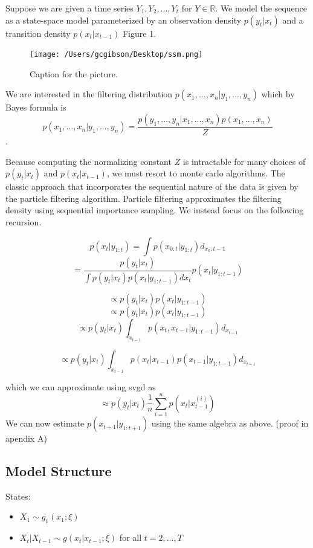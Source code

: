 \documentclass[]{article}
\begin{document}
Suppose we are given a time series \(Y_1,Y_2,...,Y_t\) for
\(Y \in \mathbb{R}\). We model the sequence as a state-space model
parameterized by an observation density \(p(y_t | x_t)\) and a
transition density \(p(x_t | x_{t-1})\) Figure 1.

\begin{figure}[htbp]
\centering
\texttt{[image: /Users/gcgibson/Desktop/ssm.png]}
\caption{Caption for the picture.}
\end{figure}

We are interested in the filtering distribution
\(p(x_1,...,x_n | y_1,...,y_n)\) which by Bayes formula is
\[p(x_1,...,x_n | y_1,...,y_n) = \frac{p(y_1,...,y_n | x_1,...,x_n) p(x_1,...,x_n)}{Z}\].

Because computing the normalizing constant \(Z\) is intractable for many
choices of \(p(y_t | x_t)\) and \(p(x_t | x_{t-1})\), we must resort to
monte carlo algorithms. The classic approach that incorporates the
sequential nature of the data is given by the particle filtering
algorithm. Particle filtering approximates the filtering density using
sequential importance sampling. We instead focus on the following
recursion.

\[p(x_t | y_{1:t}) = \int p(x_{0:t} | y_{1:t})d_{x_0:t-1}\]
\[=\frac{p(y_t | x_t)}{\int p(y_t|x_t)p(x_t | y_{1:t-1})dx_t}p(x_t | y_{1:t-1})\]

\[\propto p(y_t|x_t)p(x_t | y_{1:t-1})\]
\[\propto p(y_t|x_t)p(x_t | y_{1:t-1})\]
\[\propto p(y_t|x_t)\int_{x_{t-1}}p(x_t,x_{t-1} | y_{1:t-1})d_{x_{t-1}}\]

\[\propto p(y_t|x_t)\int_{x_{t-1}}p(x_t |x_{t-1} )p(x_{t-1}| y_{1:t-1})d_{x_{t-1}}\]

which we can approximate using svgd as
\[\approx p(y_t|x_t) \frac{1}{n}\sum_{i=1}^n p(x_t | x_{t-1}^{(i)})\] We
can now estimate \(p(x_{t+1}|y_{1:t+1})\) using the same algebra as
above. (proof in apendix A)

\subsection{Model Structure}\label{model-structure}

States:

\begin{itemize}
\item $X_1 \sim g_1(x_1 ; \xi)$
\item $X_t \vert X_{t-1} \sim g(x_t \vert x_{t - 1} ; \xi)$ for all $t = 2, \ldots, T$
\end{itemize}
\end{document}
